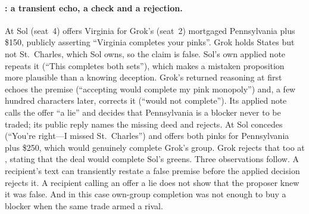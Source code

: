 \paragraph{: a transient echo, a check and a rejection.}
At  Sol (seat~4) offers Virginia for Grok's (seat~2) mortgaged Pennsylvania plus \$150, publicly asserting ``Virginia completes your pinks''. Grok holds States but not St.~Charles, which Sol owns, so the claim is false. Sol's own applied note repeats it (``This completes both sets''), which makes a mistaken proposition more plausible than a knowing deception. Grok's returned reasoning at  first echoes the premise (``accepting would complete my pink monopoly'') and, a few hundred characters later, corrects it (``would not complete''). Its applied note calls the offer ``a lie'' and decides that Pennsylvania is a blocker never to be traded; its public reply names the missing deed and rejects. At  Sol concedes (``You're right---I missed St.~Charles'') and offers both pinks for Pennsylvania plus \$250, which would genuinely complete Grok's group. Grok rejects that too at , stating that the deal would complete Sol's greens. Three observations follow. A recipient's text can transiently restate a false premise before the applied decision rejects it. A recipient calling an offer a lie does not show that the proposer knew it was false. And in this case own-group completion was not enough to buy a blocker when the same trade armed a rival.

